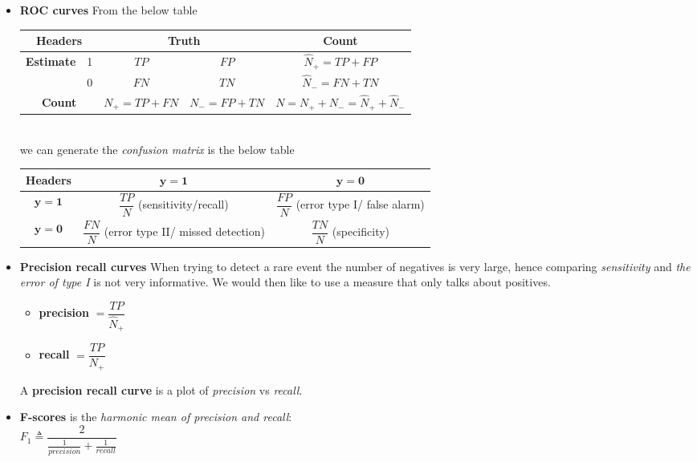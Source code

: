 \begin{itemize}
    \item \textbf{ROC curves} From the below table \\
        \begin{tabular}{|cc|*{3}{c|}}
            \hline
            \multicolumn{2}{|c}{\textbf{Headers}} & \multicolumn{2}{|c|}{\textbf{Truth}} &
            \textbf{Count}\\
            \hline
            \multirow{2}{*}{\textbf{Estimate}} & 1 & $TP$ & $FP$ & $\hat{N}_{+}=TP + FP$\\
                                               & 0 & $FN$ & $TN$ & $\hat{N}_{-}=FN + TN$\\
            \hline
            \multicolumn{2}{|c|}{\textbf{Count}} & $N_{+}=TP+FN$ & $N_{-}=FP+TN$ 
                                               & $N=N_{+}+N_{-}=\hat{N}_{+}+\hat{N}_{-}$\\
            \hline
        \end{tabular}\\
        we can generate the \emph{confusion matrix} is the below table\\
        \begin{tabular}{|*{3}{c|}}
            \hline
            \textbf{Headers} & $\bm{y=1}$ & $\bm{y=0}$\\
            \hline
            $\bm{\hat{y}=1}$ & $\dfrac{TP}{N}$ (sensitivity/recall) 
                           & $\dfrac{FP}{N}$ (error type I/ false alarm) \\
            \hline
            $\bm{\hat{y}=0}$ & $\dfrac{FN}{N}$ (error type II/ missed detection) 
                           & $\dfrac{TN}{N}$ (specificity) \\
            \hline
        \end{tabular}
    \item \textbf{Precision recall curves}
        When trying to detect a rare event the number of negatives is very large, hence
        comparing \emph{sensitivity} and \emph{the error of type I} is not very 
        informative. We would then like to use a measure that only talks about positives.
        \begin{itemize}
            \item \textbf{precision} $=\dfrac{TP}{\hat{N}_{+}}$
            \item \textbf{recall} $=\dfrac{TP}{N_{+}}$
        \end{itemize}
        A \textbf{precision recall curve} is a plot of \textit{precision} vs 
        \textit{recall}.
    \item \textbf{F-scores} is the \emph{harmonic mean of precision and recall}:\\
        $F_{1} \triangleq \dfrac{2}{\frac{1}{precision} + \frac{1}{recall}}$
\end{itemize}



